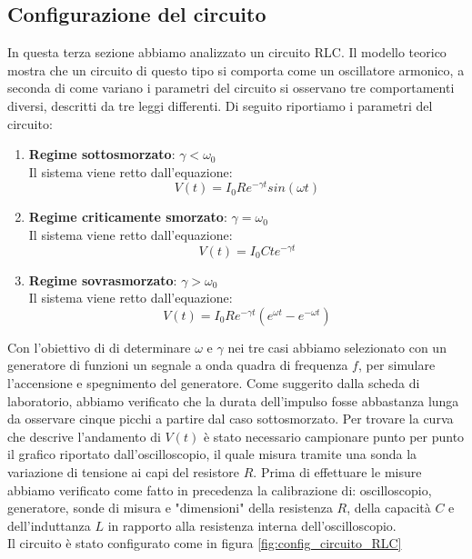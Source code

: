 \documentclass[letterpaper,12pt]{article}
\begin{document}
\subsection{Configurazione del circuito}
In questa terza sezione abbiamo analizzato un circuito RLC. Il modello teorico mostra che un circuito di questo tipo si comporta come un oscillatore armonico, a seconda di come variano i parametri del circuito si osservano tre comportamenti diversi, descritti da tre leggi differenti. Di seguito riportiamo i parametri del circuito:
\begin{enumerate}
	\item \textbf{Regime sottosmorzato}: $\gamma < \omega_0$\\
	      Il sistema viene retto dall'equazione:
	      \begin{equation}
		      \label{eq: Modello sottosmorzato}
		      V(t) = I_0Re^{-\gamma t} sin(\omega t)
	      \end{equation}

	\item \textbf{Regime criticamente smorzato}: $\gamma = \omega_0$\\
	      Il sistema viene retto dall'equazione:
	      \begin{equation}
              \label{eq: Modello criticamente smorzato}
		      V(t) = I_0Ct e^{-\gamma t}
	      \end{equation}

	\item \textbf{Regime sovrasmorzato}: $\gamma > \omega_0$\\
	      Il sistema viene retto dall'equazione:
	      \begin{equation}
              \label{eq: Modello sovrasmorzato}
		      V(t) = I_0Re^{-\gamma t} (e^{\omega t} - e^{-\omega t})
	      \end{equation}
\end{enumerate}
Con l'obiettivo di di determinare $\omega$ e $\gamma$ nei tre casi abbiamo selezionato con un generatore di funzioni un segnale a onda quadra di frequenza $f$, per simulare l'accensione e spegnimento del generatore. Come suggerito dalla scheda di laboratorio, abbiamo verificato che la durata dell'impulso fosse abbastanza lunga da osservare cinque picchi a partire dal caso sottosmorzato.
Per trovare la curva che descrive l'andamento di $V(t)$ è stato necessario campionare punto per punto il grafico riportato dall'oscilloscopio, il quale misura tramite una sonda la variazione di tensione ai capi del resistore $R$. Prima di effettuare le misure abbiamo verificato come fatto in precedenza la calibrazione di: oscilloscopio, generatore, sonde di misura e "dimensioni" della resistenza $R$, della capacità $C$ e dell'induttanza $L$ in rapporto alla resistenza interna dell'oscilloscopio.\\
Il circuito è stato configurato come in figura \ref{fig:config_circuito_RLC}\\
\end{document}
